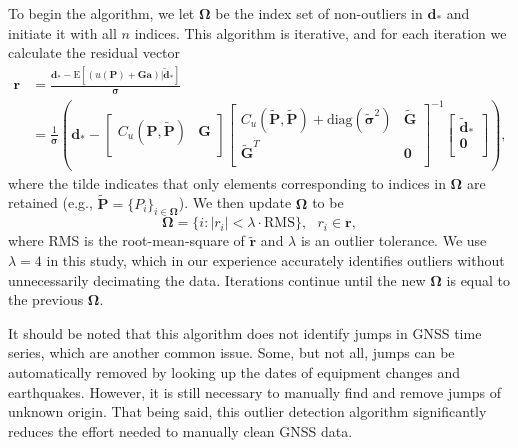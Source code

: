 To begin the algorithm, we let $\mathbf{\Omega}$ be the index set of
non-outliers in $\mathbf{d}_*$ and initiate it with all $n$ indices.
This algorithm is iterative, and for each iteration we calculate the
residual vector
\begin{align}\label{ch5:eq:Residual}
\mathbf{r} &= \frac{\mathbf{d}_* - \mathrm{E}\left[(u(\mathbf{P}) + \mathbf{G}\mathbf{a})|\tilde{\mathbf{d}}_* \right]}{\mathbf{\sigma}} \\
       &= \frac{1}{\mathbf{\sigma}}\left(\mathbf{d}_*  - 
          \left[\begin{array}{cc}
                C_u(\mathbf{P},\tilde{\mathbf{P}}) & \mathbf{G} \\
                \end{array}\right]
          \left[\begin{array}{cc}
                C_u(\tilde{\mathbf{P}},\tilde{\mathbf{P}}) + \mathrm{diag}(\tilde{\mathbf{\sigma}}^2) & \tilde{\mathbf{G}} \\
                \tilde{\mathbf{G}}^T  & \mathbf{0} \\
                \end{array}\right]^{-1}
          \left[\begin{array}{c}
                \tilde{\mathbf{d}}_* \\
                \mathbf{0} \\
                \end{array}\right]\right),
\end{align}
where the tilde indicates that only elements corresponding to indices
in $\mathbf{\Omega}$ are retained (e.g., $\tilde{\mathbf{P}} =
\{P_i\}_{i\in\mathbf{\Omega}}$). We then update $\mathbf{\Omega}$ to
be
\begin{equation}\label{ch5:eq:Update}
\mathbf{\Omega} = \{i : |r_i| < \lambda \cdot \mathrm{RMS}\}, \ \ \ r_i \in \mathbf{r},
\end{equation} 
where RMS is the root-mean-square of $\tilde{\mathbf{r}}$ and
$\lambda$ is an outlier tolerance. We use $\lambda=4$ in this study,
which in our experience accurately identifies outliers without
unnecessarily decimating the data. Iterations continue until the new
$\mathbf{\Omega}$ is equal to the previous $\mathbf{\Omega}$.

It should be noted that this algorithm does not identify jumps in GNSS
time series, which are another common issue. Some, but not all, jumps
can be automatically removed by looking up the dates of equipment
changes and earthquakes. However, it is still necessary to manually
find and remove jumps of unknown origin. That being said, this outlier
detection algorithm significantly reduces the effort needed to
manually clean GNSS data.

